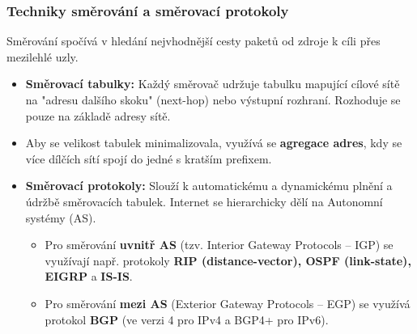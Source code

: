         \subsubsection{Techniky směrování a směrovací protokoly}
            Směrování spočívá v hledání nejvhodnější cesty paketů od zdroje k cíli přes mezilehlé uzly.
            \begin{itemize}
                \item \textbf{Směrovací tabulky:} Každý směrovač udržuje tabulku mapující cílové sítě na "adresu dalšího skoku" (next-hop) nebo výstupní rozhraní. Rozhoduje se pouze na základě adresy sítě.
                \item Aby se velikost tabulek minimalizovala, využívá se \textbf{agregace adres}, kdy se více dílčích sítí spojí do jedné s kratším prefixem.
                \item \textbf{Směrovací protokoly:} Slouží k automatickému a dynamickému plnění a údržbě směrovacích tabulek. Internet se hierarchicky dělí na Autonomní systémy (AS).
                \begin{itemize}
                    \item Pro směrování \textbf{uvnitř AS} (tzv. Interior Gateway Protocols -- IGP) se využívají např. protokoly \textbf{RIP (distance-vector), OSPF (link-state), EIGRP} a \textbf{IS-IS}.
                    \item Pro směrování \textbf{mezi AS} (Exterior Gateway Protocols -- EGP) se využívá protokol \textbf{BGP} (ve verzi 4 pro IPv4 a BGP4+ pro IPv6).
                \end{itemize}
            \end{itemize}
